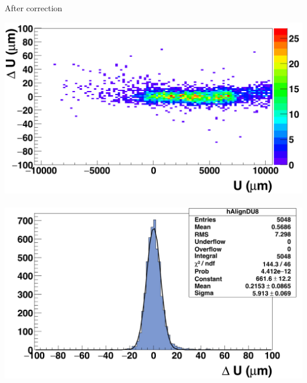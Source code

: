 \documentclass{beamer}
\begin{document}
\begin{frame}
\begin{columns}[c]
      \begin{column}{5cm}
        \begin{block}{After correction}
          \begin{center}
            \includegraphics[width = 1.01\textwidth]{Pictures/deltaUU_8_corrected1.png}
          \
          \includegraphics[width = 1.01\textwidth]{Pictures/deltaU_8_corrected1.png}
          \end{center}

          \vspace{-0.52cm}
        \end{block}
      \end{column}
    \end{columns}

  \end{frame}
\end{document}
